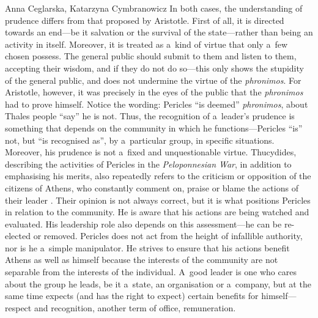 \begin{artengenv2auth}{Anna Ceglarska, Katarzyna Cymbranowicz}
In both cases, the understanding of prudence differs from that proposed by Aristotle. First of all, it is directed towards an end---be it salvation or the survival of the state---rather than being an activity in itself. Moreover, it is treated as a~kind of virtue that only a~few chosen possess. The general public should submit to them and listen to them, accepting their wisdom, and if they do not do so---this only shows the stupidity of the general public, and does not undermine the virtue of the \textit{phronimos}. For Aristotle, however, it was precisely in the eyes of the public that the \textit{phronimos} had to prove himself. Notice the wording: Pericles ``is deemed'' \textit{phronimos}, about Thales people ``say'' he is not. Thus, the recognition of a~leader's prudence is something that depends on the community in which he functions---Pericles ``is'' not, but ``is recognised as'', by a~particular group, in specific situations. Moreover, his prudence is not a~fixed and unquestionable virtue. Thucydides, describing the activities of Pericles in the \textit{Peloponnesian War}, in addition to emphasising his merits, also repeatedly refers to the criticism or opposition of the citizens of Athens, who constantly comment on, praise or blame the actions of their leader 
\parencite[][]{hammond_peloponnesian_2009}. %
 Their opinion is not always correct, but it is what positions Pericles in relation to the community. He is aware that his actions are being watched and evaluated. His leadership role also depends on this assessment---he can be re-elected or removed. Pericles does not act from the height of infallible authority, nor is he a~simple manipulator. He strives to ensure that his actions benefit Athens as well as himself because the interests of the community are not separable from the interests of the individual. A~good leader is one who cares about the group he leads, be it a~state, an organisation or a~company, but at the same time expects (and has the right to expect) certain benefits for himself---respect and recognition, another term of office, remuneration.




\end{artengenv2auth}
